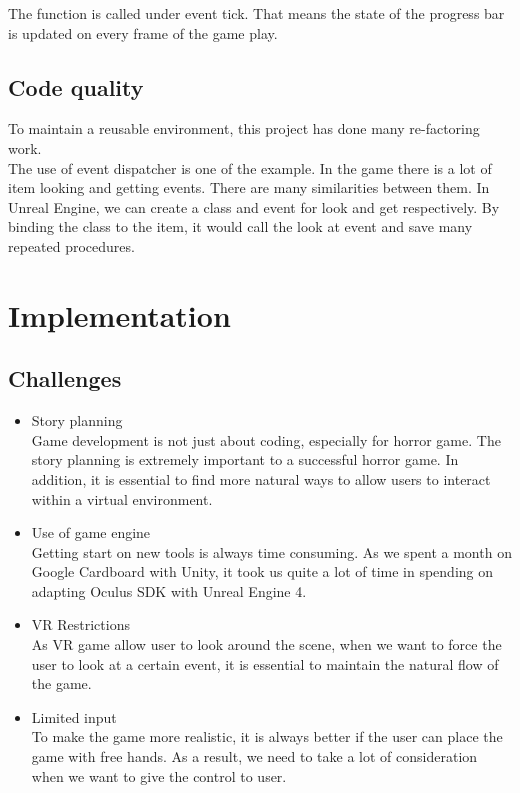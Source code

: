 \documentclass{article}
\begin{document}
The function is called under event tick. That means the state of the progress bar is updated on every frame of the game play.

\subsection{Code quality}
To maintain a reusable environment, this project has done many re-factoring work. \\
The use of event dispatcher is one of the example. In the game there is a lot of item looking and getting events. There are many similarities between them. In Unreal Engine, we can create a class and event for look and get respectively. By binding the class to the item, it would call the look at event and save many repeated procedures.  

\clearpage

\section{Implementation}
\subsection{Challenges}

\begin{itemize}
  \item Story planning\\
  Game development is not just about coding, especially for horror game. The story planning is extremely important to a successful horror game. In addition, it is essential to find more natural ways to allow users to interact within a virtual environment.
  \item Use of game engine\\
  Getting start on new tools is always time consuming. As we spent a month on Google Cardboard with Unity, it took us quite a lot of time in spending on adapting Oculus SDK with Unreal Engine 4.
  \item VR Restrictions\\
  As VR game allow user to look around the scene, when we want to force the user to look at a certain event, it is essential to maintain the natural flow of the game. 
  \item Limited input\\
  To make the game more realistic, it is always better if the user can place the game with free hands. As a result, we need to take a lot of consideration when we want to give the control to user.
\end{itemize}
\end{document}
